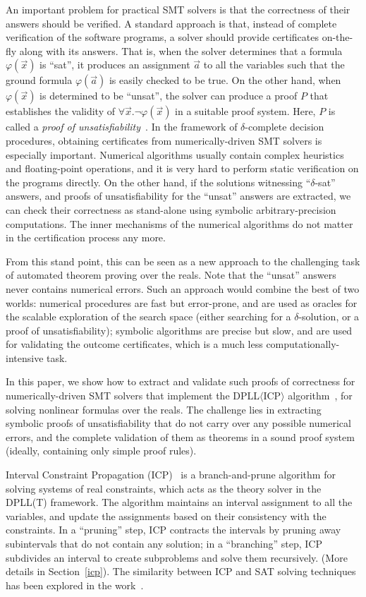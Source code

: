 \documentclass[envcountsect]{llncs}
\begin{document}
An important problem
for practical SMT solvers is that the correctness
of their answers should be verified. A standard approach is that, instead of
complete verification of the software programs, a solver should provide
certificates on-the-fly along with its answers. That is, when the solver
determines that a formula $\varphi(\vec x)$ is ``sat'', it produces an
assignment $\vec a$ to all the
variables such that the ground formula $\varphi(\vec a)$ is easily checked to be
true. On the other hand, when $\varphi(\vec x)$ is determined to be ``unsat'',
the solver can produce a proof $P$ that establishes the validity of $\forall
\vec x.\neg\varphi(\vec x)$ in a suitable proof system. Here, $P$ is called a
{\em proof of unsatisfiability}~\cite{}. In the framework of $\delta$-complete
decision procedures, obtaining certificates from numerically-driven SMT solvers
is especially important. Numerical algorithms usually contain complex heuristics
and floating-point operations, and it is very hard to perform static
verification on the programs directly. On the other hand, if the solutions
witnessing ``$\delta$-sat'' answers, and proofs of unsatisfiability for the
``unsat'' answers are extracted,
we can check their correctness as stand-alone using symbolic
arbitrary-precision computations. The inner mechanisms of the numerical
algorithms do not matter in the certification process any more. 

From this stand point, this can be seen as a new approach to the challenging
task of automated theorem proving over the reals. Note that the ``unsat''
answers never contains numerical errors. Such an approach
 would combine the best of two worlds: numerical procedures are
fast but error-prone, and are used as oracles for the scalable exploration of
the search space (either searching for a $\delta$-solution, or a proof of
unsatisfiability); symbolic algorithms are precise but slow, and are used for
validating the outcome certificates, which is a much less
computationally-intensive task. 

In this paper, we show how to extract and validate such proofs
of correctness for numerically-driven SMT solvers that implement the
DPLL$\langle$ICP$\rangle$ algorithm~\cite{}, for solving nonlinear formulas over
the reals. The challenge lies in extracting symbolic proofs of unsatisfiability
that do not carry over any possible numerical errors, and the complete
validation of them as theorems in a sound proof system (ideally, containing only
simple proof rules). 

Interval Constraint Propagation (ICP)~\cite{} is a branch-and-prune algorithm
for solving systems of real constraints, which acts as the theory solver in the
DPLL(T) framework. The algorithm maintains an interval
assignment to all the variables, and update the assignments based on their
consistency with the constraints. In a ``pruning''
step, ICP contracts the intervals by pruning away subintervals that do not
contain any solution; in a ``branching'' step, ICP subdivides an interval to
create subproblems and solve them recursively. (More details in
Section~\ref{icp}). The similarity between ICP and SAT solving techniques has
been explored in the work~\cite{}. 
\end{document}
